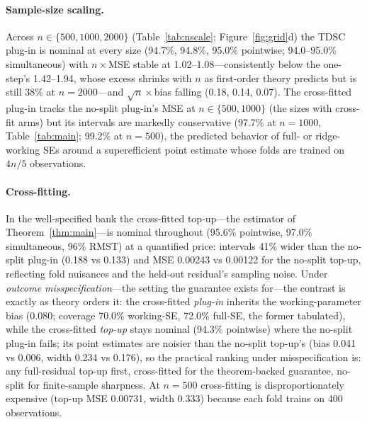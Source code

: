 \documentclass[11pt]{article}
\theoremstyle{remark}
\begin{document}
\paragraph{Sample-size scaling.} Across $n\in\{500,1000,2000\}$ (Table~\ref{tab:nscale}; Figure~\ref{fig:grid}d) the TDSC plug-in is nominal at every size (94.7\%, 94.8\%, 95.0\% pointwise; 94.0--95.0\% simultaneous) with $n\times$MSE stable at 1.02--1.08---consistently below the one-step's 1.42--1.94, whose excess shrinks with $n$ as first-order theory predicts but is still 38\% at $n=2000$---and $\sqrt n\times$bias falling (0.18, 0.14, 0.07). The cross-fitted plug-in tracks the no-split plug-in's MSE at $n\in\{500, 1000\}$ (the sizes with cross-fit arms) but its intervals are markedly conservative (97.7\% at $n{=}1000$, Table~\ref{tab:main}; 99.2\% at $n{=}500$), the predicted behavior of full- or ridge-working SEs around a superefficient point estimate whose folds are trained on $4n/5$ observations.

\paragraph{Cross-fitting.} In the well-specified bank the cross-fitted top-up---the estimator of Theorem~\ref{thm:main}---is nominal throughout (95.6\% pointwise, 97.0\% simultaneous, 96\% RMST) at a quantified price: intervals 41\% wider than the no-split plug-in (0.188 vs 0.133) and MSE 0.00243 vs 0.00122 for the no-split top-up, reflecting fold nuisances and the held-out residual's sampling noise. Under \emph{outcome misspecification}---the setting the guarantee exists for---the contrast is exactly as theory orders it: the cross-fitted \emph{plug-in} inherits the working-parameter bias (0.080; coverage 70.0\% working-SE, 72.0\% full-SE, the former tabulated), while the cross-fitted \emph{top-up} stays nominal (94.3\% pointwise) where the no-split plug-in fails; its point estimates are noisier than the no-split top-up's (bias 0.041 vs 0.006, width 0.234 vs 0.176), so the practical ranking under misspecification is: any full-residual top-up first, cross-fitted for the theorem-backed guarantee, no-split for finite-sample sharpness. At $n=500$ cross-fitting is disproportionately expensive (top-up MSE 0.00731, width 0.333) because each fold trains on 400 observations.
\end{document}
